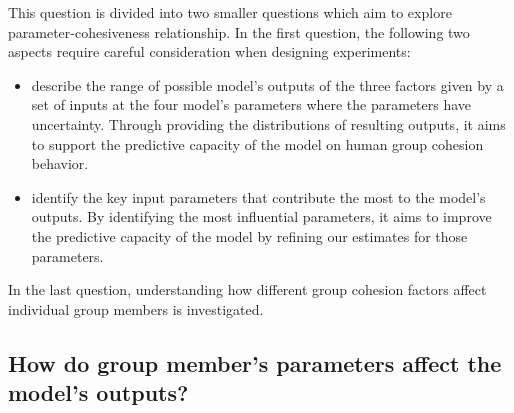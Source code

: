 \documentclass[a4paper,11pt,phdthesis,singlespace,twoside]{cssethesis}
\begin{document}
This question is divided into two smaller questions which aim to explore parameter-cohesiveness relationship. In the first question, the following two aspects require careful consideration when designing experiments:
\begin{itemize}
	\item describe the range of possible model’s outputs of the three factors given by a set of inputs at the four model’s parameters where the parameters have uncertainty. Through providing the distributions of resulting outputs, it aims to support the predictive capacity of the model on human group cohesion behavior. 
	\item identify the key input parameters that contribute the most to the model’s outputs. By identifying the most influential parameters, it aims to improve the predictive capacity of the model by refining our estimates for those parameters.
\end{itemize}	
In the last question, understanding how different group cohesion factors affect individual group members is investigated.
\subsection{How do group member's parameters affect the model's outputs?}
\end{document}
